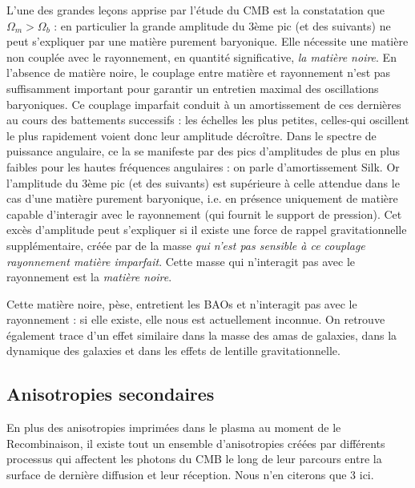 L'une des grandes leçons apprise par l'étude du CMB est la constatation que $\Omega_m>\Omega_b$ : en particulier la grande amplitude du 3ème pic (et des suivants) ne peut s'expliquer par une matière purement baryonique. Elle nécessite une matière non couplée avec le rayonnement, en quantité significative, \textit{la matière noire}. En l'absence de matière noire, le couplage entre matière et rayonnement n'est pas suffisamment important pour garantir un entretien maximal des oscillations baryoniques. Ce couplage imparfait conduit à un amortissement de ces dernières au cours des battements successifs : les échelles les plus petites, celles-qui oscillent le plus rapidement voient donc leur amplitude décroître. Dans le spectre de puissance angulaire, ce la se manifeste par des pics d'amplitudes de plus en plus faibles pour les hautes fréquences angulaires : on parle d'amortissement Silk. Or l'amplitude du 3ème pic (et des suivants) est supérieure à celle attendue dans le cas d'une matière  purement baryonique, i.e. en présence uniquement de matière capable d'interagir avec le rayonnement (qui fournit le support de pression). Cet excès d'amplitude peut s'expliquer si il existe une force de rappel gravitationnelle supplémentaire, créée par de la masse \textit{qui n'est pas sensible à ce couplage rayonnement matière imparfait}. Cette masse qui n'interagit pas avec le rayonnement est la \textit{matière noire}.

Cette matière noire, pèse, entretient les BAOs et n'interagit pas avec le rayonnement : si elle existe, elle nous est actuellement inconnue. On retrouve également trace d'un effet similaire dans la masse des amas de galaxies, dans la dynamique des galaxies et dans les effets de lentille gravitationnelle.

\subsection{Anisotropies secondaires}
En plus des anisotropies imprimées dans le plasma au moment de le Recombinaison, il existe tout un ensemble d'anisotropies créées par différents processus qui affectent les photons du CMB le long de leur parcours entre la surface de dernière diffusion et leur réception. Nous n'en citerons que 3 ici.

